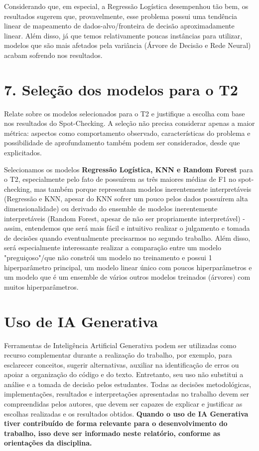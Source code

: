 \documentclass[11pt,letterpaper]{article}
\begin{document}
Considerando que, em especial, a Regressão Logística desempenhou tão bem, os resultados sugerem que, provavelmente, esse problema possui uma tendência linear de mapeamento de dados-alvo/fronteira de decisão aproximadamente linear. Além disso, já que temos relativamente poucas instâncias para utilizar, modelos que são mais afetados pela variância (Árvore de Decisão e Rede Neural) acabam sofrendo nos resultados.

\section*{7. Seleção dos modelos para o T2}

Relate sobre os modelos selecionados para o T2 e justifique a escolha com base nos resultados do Spot-Checking. A seleção não precisa considerar apenas a maior métrica: aspectos como comportamento observado, características do problema e possibilidade de aprofundamento também podem ser considerados, desde que explicitados.

Selecionamos os modelos \textbf{Regressão Logística, KNN e Random Forest} para o T2, especialmente pelo fato de possuírem as três maiores médias de F1 no spot-checking, mas também porque representam modelos inerentemente interpretáveis (Regressão e KNN, apesar do KNN sofrer um pouco pelos dados possuírem alta dimensionalidade) ou derivado do ensemble de modelos inerentemente interpretáveis (Random Forest, apesar de não ser propriamente interpretável) - assim, entendemos que será mais fácil e intuitivo realizar o julgamento e tomada de decisões quando eventualmente precisarmos no segundo trabalho. Além disso, será especialmente interessante realizar a comparação entre um modelo "preguiçoso"/que não constrói um modelo no treinamento e possui 1 hiperparâmetro principal, um modelo linear único com poucos hiperparâmetros e um modelo que é um ensemble de vários outros modelos treinados (árvores) com muitos hiperparâmetros.

\section*{Uso de IA Generativa}

Ferramentas de Inteligência Artificial Generativa podem ser utilizadas como recurso complementar durante a realização do trabalho, por exemplo, para esclarecer conceitos, sugerir alternativas, auxiliar na identificação de erros ou apoiar a organização do código e do texto. Entretanto, seu uso não substitui a análise e a tomada de decisão pelos estudantes. Todas as decisões metodológicas, implementações, resultados e interpretações apresentadas no trabalho devem ser compreendidas pelos autores, que devem ser capazes de explicar e justificar as escolhas realizadas e os resultados obtidos. \textbf{Quando o uso de IA Generativa tiver contribuído de forma relevante para o desenvolvimento do trabalho, isso deve ser informado neste relatório, conforme as orientações da disciplina.}
\end{document}
